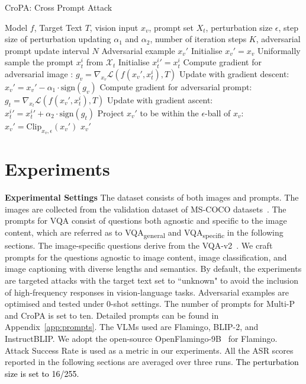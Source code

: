     

\begin{algorithm}[t]
\footnotesize
\caption{CroPA: Cross Prompt Attack}
\label{algo:alter}
\begin{algorithmic}[1]
\REQUIRE Model \(f\), Target Text $T$, vision input \(x_v\),  prompt set \(X_t\), perturbation size \(\epsilon\),  step size of perturbation updating \(\alpha_1\) and \(\alpha_2\), number of iteration steps \(   K\), adversarial prompt update interval \(N\)
\ENSURE Adversarial example \(x_v'\)
\STATE Initialise \(x_v' = x_v\)
    \STATE Uniformally sample the prompt \(x_t^{i}\) from \(\mathcal{X}_t\)
        \STATE Initialise \(x_t^{i}{'} = x_t^i\)
    \ENDIF
    \STATE Compute gradient for adversarial image : \(g_v = \nabla_{x_v}\mathcal{L}(f(x_v', x_t^i), T)\)
    \STATE Update with gradient descent: \(x_v' = x_v' - \alpha_1 \cdot \text{sign}(g_v)\)
         \STATE Compute gradient for adversarial prompt: \(g_t = \nabla_{x_t}\mathcal{L}(f(x_v', x_t^i), T)\)
        \STATE Update with gradient ascent: \(x_t^{i}{'} = x_t^{i}{'} + \alpha_2 \cdot \text{sign}(g_t)\)
    \ENDIF
    \STATE Project \(x_v'\) to be within the \(\epsilon\)-ball of \(x_v\): 
    \(x_v' = \text{Clip}_{x_v,\epsilon}(x_v')\)
\ENDFOR
\RETURN \(x_v'\)
\end{algorithmic}
\end{algorithm}

\section{Experiments}
\vspace{-0.4cm}

\textbf{Experimental Settings}
The dataset consists of both images and prompts. The images are collected from the validation dataset of MS-COCO datasets~\citep{lin2014microsoft-mscoco}. The prompts for VQA consist of questions both agnostic and specific to the image content, which are referred as to VQA\textsubscript{general} and VQA\textsubscript{specific} in the following sections. The image-specific questions derive from the VQA-v2~\citep{goyal2017making-vqav2}. We craft prompts for the questions agnostic to image content, image classification, and image captioning with diverse lengths and semantics. By default, the experiments are targeted attacks with the target text set to ``unknown" to avoid the inclusion of high-frequency responses in vision-language tasks. Adversarial examples are optimised and tested under 0-shot settings. The number of prompts for Multi-P and CroPA is set to ten. Detailed prompts can be found in Appendix~\ref{app:prompts}. The VLMs used are Flamingo, BLIP-2, and InstructBLIP. We adopt the open-source OpenFlamingo-9B~\citep{awadalla2023openflamingo} for Flamingo. Attack Success Rate is used as a metric in our experiments. All the ASR scores reported in the following sections are averaged over three runs. \textcolor{black}{The perturbation size is set to 16/255.}

